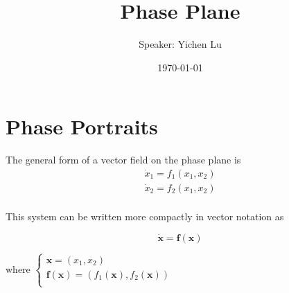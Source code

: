 \documentclass[10pt,aspectratio=43,mathserif,table]{beamer}
\title{Phase Plane}
\author{Speaker: Yichen Lu\quad \newline  \newline \quad }
\institute{\fontsize{8pt}{14pt}}
\date{\today}
\begin{document}

\frame{\titlepage}


\section{Phase Portraits} %

\begin{frame}
    The general form of a vector field on the phase plane is
    $$
    \begin{array}{c}
        \dot{x}_1=f_1\left( x_1,x_2 \right)\\
        \dot{x}_2=f_2\left( x_1,x_2 \right)\\
    \end{array}
    $$

    This system can be written more compactly in vector notation as

    $$\dot{\mathbf{x}}=\mathbf{f}\left( \mathbf{x} \right) $$

    where 
    $\begin{cases}
        \mathbf{x}=\left( x_1,x_2 \right)\\
        \mathbf{f}\left( \mathbf{x} \right) =\left( f_1\left( \mathbf{x} \right) ,f_2\left( \mathbf{x} \right) \right)\\
    \end{cases}$
\end{frame}
\end{document}

